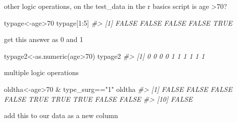 \documentclass[
]{article}
\newenvironment{Shaded}{\begin{snugshade}}{\end{snugshade}}
\newcommand{\CommentTok}[1]{\textcolor[rgb]{0.56,0.35,0.01}{\textit{#1}}}
\newcommand{\DecValTok}[1]{\textcolor[rgb]{0.00,0.00,0.81}{#1}}
\newcommand{\FunctionTok}[1]{\textcolor[rgb]{0.00,0.00,0.00}{#1}}
\newcommand{\NormalTok}[1]{#1}
\newcommand{\OtherTok}[1]{\textcolor[rgb]{0.56,0.35,0.01}{#1}}
\newcommand{\SpecialCharTok}[1]{\textcolor[rgb]{0.00,0.00,0.00}{#1}}
\newcommand{\StringTok}[1]{\textcolor[rgb]{0.31,0.60,0.02}{#1}}
\begin{document}
other logic operations, on the test\_data in the r basics script
is age \textgreater70?

\begin{Shaded}
\begin{Highlighting}[]
\NormalTok{typage}\OtherTok{\textless{}{-}}\NormalTok{age}\SpecialCharTok{\textgreater{}}\DecValTok{70}
\NormalTok{typage[}\DecValTok{1}\SpecialCharTok{:}\DecValTok{5}\NormalTok{]}
\CommentTok{\#\textgreater{} [1] FALSE FALSE FALSE FALSE  TRUE}
\end{Highlighting}
\end{Shaded}

get this answer as 0 and 1

\begin{Shaded}
\begin{Highlighting}[]
\NormalTok{typage2}\OtherTok{\textless{}{-}}\FunctionTok{as.numeric}\NormalTok{(age}\SpecialCharTok{\textgreater{}}\DecValTok{70}\NormalTok{)}
\NormalTok{typage2  }
\CommentTok{\#\textgreater{}  [1] 0 0 0 0 1 1 1 1 1 1}
\end{Highlighting}
\end{Shaded}

multiple logic operations

\begin{Shaded}
\begin{Highlighting}[]
\NormalTok{oldtha}\OtherTok{\textless{}{-}}\NormalTok{age}\SpecialCharTok{\textgreater{}}\DecValTok{70} \SpecialCharTok{\&}\NormalTok{ type\_surg}\SpecialCharTok{==}\StringTok{"1"}
\NormalTok{oldtha}
\CommentTok{\#\textgreater{}  [1] FALSE FALSE FALSE FALSE  TRUE  TRUE  TRUE FALSE FALSE}
\CommentTok{\#\textgreater{} [10] FALSE}
\end{Highlighting}
\end{Shaded}

add this to our data as a new column
\end{document}
